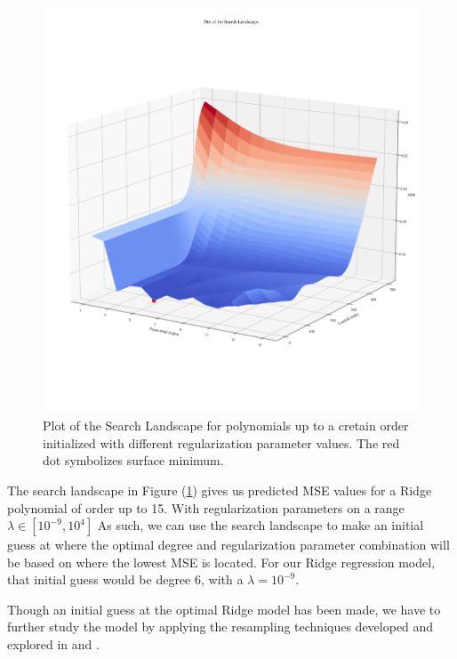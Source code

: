 \documentclass[11pt, a4paper]{article}
\begin{document}
\begin{figure}
  \centering
  \hspace*{-3.5cm}
  \includegraphics[scale=0.58]{figures/EX4_search_landscape_plt.pdf}
  \caption{\label{fig:ridge_search_land}Plot of the Search Landscape for polynomials up to a cretain order initialized with different regularization parameter values. The red dot symbolizes surface minimum.}
\end{figure}

The search landscape in Figure (\ref{fig:ridge_search_land}) gives us predicted MSE values for a Ridge polynomial of order up to 15. With regularization parameters on a range $\lambda \in \left[10^{-9},10^{4}\right]$ As such, we can use the search landscape to make an initial guess at where the optimal degree and regularization parameter combination will be based on where the lowest MSE is located. For our Ridge regression model, that initial guess would be degree 6, with a $\lambda = 10^{-9}$.

Though an initial guess at the optimal Ridge model has been made, we have to further study the model by applying the resampling techniques developed and explored in  and .
\end{document}
